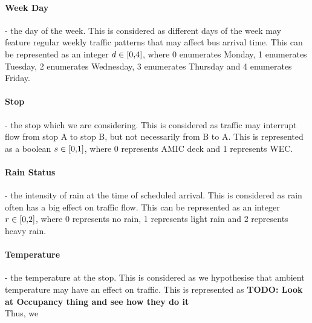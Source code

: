 \documentclass[12pt]{extarticle}
\begin{document}
\paragraph{Week Day} - the day of the week. This is considered as different days of the week may feature regular weekly traffic patterns that may affect bus arrival time. This can be represented as an integer $d \in \interval[{0,4}]$, where 0 enumerates Monday, 1 enumerates Tuesday, 2 enumerates Wednesday, 3 enumerates Thursday and 4 enumerates Friday.
\paragraph{Stop} - the stop which we are considering. This is considered as traffic may interrupt flow from stop A to stop B, but not necessarily from B to A. This is represented as a boolean $s \in \interval[{0,1}]$, where 0 represents AMIC deck and 1 represents WEC.
\paragraph{Rain Status} - the intensity of rain at the time of scheduled arrival. This is considered as rain often has a big effect on traffic flow. This can be represented as an integer $r \in \interval[{0,2}]$, where 0 represents no rain, 1 represents light rain and 2 represents heavy rain.
\paragraph{Temperature} - the temperature at the stop. This is considered as we hypothesise that ambient temperature may have an effect on traffic. This is represented as \textbf{TODO: Look at Occupancy thing and see how they do it}
\\
Thus, we 
\end{document}
